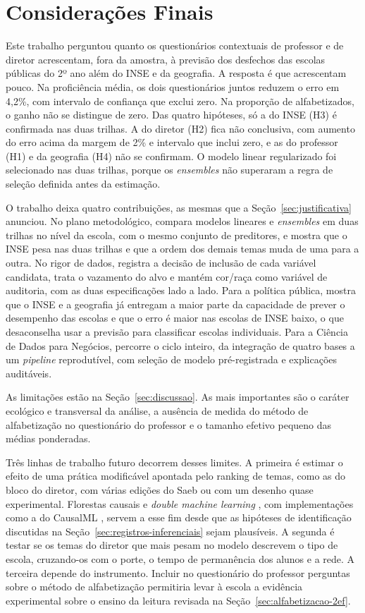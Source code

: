 \chapter{Considerações Finais}
\label{cap:consideracoes}

Este trabalho perguntou quanto os questionários contextuais de professor e
de diretor acrescentam, fora da amostra, à previsão dos desfechos das
escolas públicas do 2º ano além do INSE e da geografia. A resposta é que
acrescentam pouco. Na proficiência média, os dois questionários juntos
reduzem o erro em 4,2\%, com intervalo de confiança que exclui zero. Na
proporção de alfabetizados, o ganho não se distingue de zero. Das quatro
hipóteses, só a do INSE (H3) é confirmada nas duas trilhas. A do diretor
(H2) fica não conclusiva, com aumento do erro acima da margem de 2\% e
intervalo que inclui zero, e as do professor (H1) e da
geografia (H4) não se confirmam. O modelo linear regularizado foi
selecionado nas duas trilhas, porque os \textit{ensembles} não superaram a
regra de seleção definida antes da estimação.

O trabalho deixa quatro contribuições, as mesmas que a
Seção~\ref{sec:justificativa} anunciou. No plano metodológico, compara
modelos lineares e \textit{ensembles} em duas trilhas no nível da escola,
com o mesmo conjunto de preditores, e mostra que o INSE pesa nas duas
trilhas e que a ordem dos demais temas muda de uma para a outra.
No rigor de dados, registra a decisão de inclusão de cada variável
candidata, trata o vazamento do alvo e mantém cor/raça como variável de
auditoria, com as duas especificações lado a lado. Para a política pública,
mostra que o INSE e a geografia já entregam a maior parte da capacidade de
prever o desempenho das escolas e que o erro é maior nas escolas de INSE
baixo, o que desaconselha usar a previsão para classificar escolas
individuais. Para a Ciência de Dados para Negócios, percorre o ciclo
inteiro, da integração de quatro bases a um \textit{pipeline}
reprodutível, com seleção de modelo pré-registrada e explicações
auditáveis.

As limitações estão na Seção~\ref{sec:discussao}. As mais importantes são
o caráter ecológico e transversal da análise, a ausência de medida do
método de alfabetização no questionário do professor e o tamanho efetivo
pequeno das médias ponderadas.

Três linhas de trabalho futuro decorrem desses limites. A primeira é
estimar o efeito de uma prática modificável apontada pelo ranking de
temas, como as do bloco do diretor, com várias edições do Saeb ou com um
desenho quase experimental. Florestas causais \cite{wager2018causal} e
\textit{double machine learning} \cite{chernozhukov2018double}, com
implementações como a do CausalML \cite{chen2020causalml}, servem a esse
fim desde que as hipóteses de identificação discutidas na
Seção~\ref{sec:registros-inferenciais} sejam plausíveis. A segunda é testar
se os temas do diretor que mais pesam no modelo descrevem o tipo de escola,
cruzando-os com o porte, o tempo de permanência dos alunos e a rede. A
terceira depende do instrumento. Incluir no questionário do professor
perguntas sobre o método de alfabetização permitiria levar à escola a
evidência experimental sobre o ensino da leitura revisada na
Seção~\ref{sec:alfabetizacao-2ef}.
